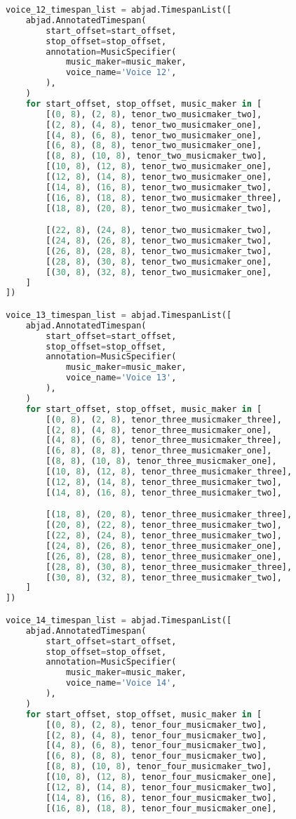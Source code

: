 \begin{lstlisting}[language=Python, caption=Invocation Source Code]
voice_12_timespan_list = abjad.TimespanList([
    abjad.AnnotatedTimespan(
        start_offset=start_offset,
        stop_offset=stop_offset,
        annotation=MusicSpecifier(
            music_maker=music_maker,
            voice_name='Voice 12',
        ),
    )
    for start_offset, stop_offset, music_maker in [
        [(0, 8), (2, 8), tenor_two_musicmaker_two],
        [(2, 8), (4, 8), tenor_two_musicmaker_one],
        [(4, 8), (6, 8), tenor_two_musicmaker_one],
        [(6, 8), (8, 8), tenor_two_musicmaker_one],
        [(8, 8), (10, 8), tenor_two_musicmaker_two],
        [(10, 8), (12, 8), tenor_two_musicmaker_one],
        [(12, 8), (14, 8), tenor_two_musicmaker_one],
        [(14, 8), (16, 8), tenor_two_musicmaker_two],
        [(16, 8), (18, 8), tenor_two_musicmaker_three],
        [(18, 8), (20, 8), tenor_two_musicmaker_two],

        [(22, 8), (24, 8), tenor_two_musicmaker_two],
        [(24, 8), (26, 8), tenor_two_musicmaker_two],
        [(26, 8), (28, 8), tenor_two_musicmaker_two],
        [(28, 8), (30, 8), tenor_two_musicmaker_one],
        [(30, 8), (32, 8), tenor_two_musicmaker_one],
    ]
])

voice_13_timespan_list = abjad.TimespanList([
    abjad.AnnotatedTimespan(
        start_offset=start_offset,
        stop_offset=stop_offset,
        annotation=MusicSpecifier(
            music_maker=music_maker,
            voice_name='Voice 13',
        ),
    )
    for start_offset, stop_offset, music_maker in [
        [(0, 8), (2, 8), tenor_three_musicmaker_three],
        [(2, 8), (4, 8), tenor_three_musicmaker_one],
        [(4, 8), (6, 8), tenor_three_musicmaker_three],
        [(6, 8), (8, 8), tenor_three_musicmaker_one],
        [(8, 8), (10, 8), tenor_three_musicmaker_one],
        [(10, 8), (12, 8), tenor_three_musicmaker_three],
        [(12, 8), (14, 8), tenor_three_musicmaker_two],
        [(14, 8), (16, 8), tenor_three_musicmaker_two],

        [(18, 8), (20, 8), tenor_three_musicmaker_three],
        [(20, 8), (22, 8), tenor_three_musicmaker_two],
        [(22, 8), (24, 8), tenor_three_musicmaker_two],
        [(24, 8), (26, 8), tenor_three_musicmaker_one],
        [(26, 8), (28, 8), tenor_three_musicmaker_one],
        [(28, 8), (30, 8), tenor_three_musicmaker_three],
        [(30, 8), (32, 8), tenor_three_musicmaker_two],
    ]
])

voice_14_timespan_list = abjad.TimespanList([
    abjad.AnnotatedTimespan(
        start_offset=start_offset,
        stop_offset=stop_offset,
        annotation=MusicSpecifier(
            music_maker=music_maker,
            voice_name='Voice 14',
        ),
    )
    for start_offset, stop_offset, music_maker in [
        [(0, 8), (2, 8), tenor_four_musicmaker_two],
        [(2, 8), (4, 8), tenor_four_musicmaker_two],
        [(4, 8), (6, 8), tenor_four_musicmaker_two],
        [(6, 8), (8, 8), tenor_four_musicmaker_two],
        [(8, 8), (10, 8), tenor_four_musicmaker_two],
        [(10, 8), (12, 8), tenor_four_musicmaker_one],
        [(12, 8), (14, 8), tenor_four_musicmaker_two],
        [(14, 8), (16, 8), tenor_four_musicmaker_two],
        [(16, 8), (18, 8), tenor_four_musicmaker_one],


\end{lstlisting}
